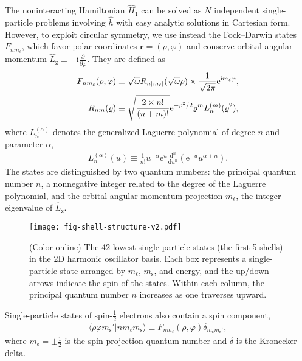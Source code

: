 \documentclass[thesis.tex]{subfiles}
\begin{document}
The noninteracting Hamiltonian $\hat{H}_1$ can be solved as $N$ independent single-particle problems involving $\hat{h}$ with easy analytic solutions in Cartesian form.  However, to exploit circular symmetry, we use instead the Fock--Darwin states $F_{n m_\ell}$, which favor polar coordinates $\bm{r} = (\rho, \varphi)$ and conserve orbital angular momentum $\hat{L}_{\mathrm{z}} \equiv -\mathrm{i} \frac{\partial}{\partial \varphi}$.  They are defined as\cite{lohne2010coupled}
\begin{align}
  F_{n m_\ell}(\rho, \varphi) &\equiv \sqrt\omega R_{n |m_\ell|}(\sqrt \omega \rho) \times \frac{1}{\sqrt{2 \pi}} \mathrm{e}^{\mathrm{i} m_\ell \varphi} \label{eq:fockdarwin}, \\
  R_{n m}(\varrho) &\equiv \sqrt{\frac{2 \times n!}{(n + m)!}} \mathrm{e}^{-\varrho^2 / 2} \varrho^m L_n^{(m)}(\varrho^2), \notag
\end{align}
where $L_n^{(\alpha)}$ denotes the generalized Laguerre polynomial \cite{NIST:DLMF} of degree $n$ and parameter $\alpha$,
\begin{align*}
  L_n^{(\alpha)}(u) \equiv \frac{1}{n!} u^{-\alpha} \mathrm{e}^u \frac{\mathrm{d}^n}{\mathrm{d} u^n} (\mathrm{e}^{-u} u^{\alpha + n}).
\end{align*}
The states are distinguished by two quantum numbers: the principal quantum number $n$, a nonnegative integer related to the degree of the Laguerre polynomial, and the orbital angular momentum projection $m_\ell$, the integer eigenvalue of $\hat{L}_{\mathrm{z}}$.

\begin{figure}
  \texttt{[image: fig-shell-structure-v2.pdf]}
  \caption{(Color online) The 42 lowest single-particle states (the first 5 shells) in the 2D harmonic oscillator basis.  Each box represents a single-particle state arranged by $m_\ell$, $m_{\mathrm{s}}$, and energy, and the up/down arrows indicate the spin of the states.  Within each column, the principal quantum number $n$ increases as one traverses upward.}
  \label{fig:shell-structure}
\end{figure}

Single-particle states of spin-$\frac{1}{2}$ electrons also contain a spin component,
\begin{align} \label{eq:singleparticlestate}
  \langle \rho \varphi m_{\mathrm{s}}' |n m_\ell m_{\mathrm{s}}\rangle \equiv F_{n m_\ell}(\rho, \varphi) \delta_{m_{\mathrm{s}}^{} m_{\mathrm{s}}'},
\end{align}
where $m_{\mathrm{s}} = \pm\frac{1}{2}$ is the spin projection quantum number and $\delta$ is the Kronecker delta.
\end{document}
